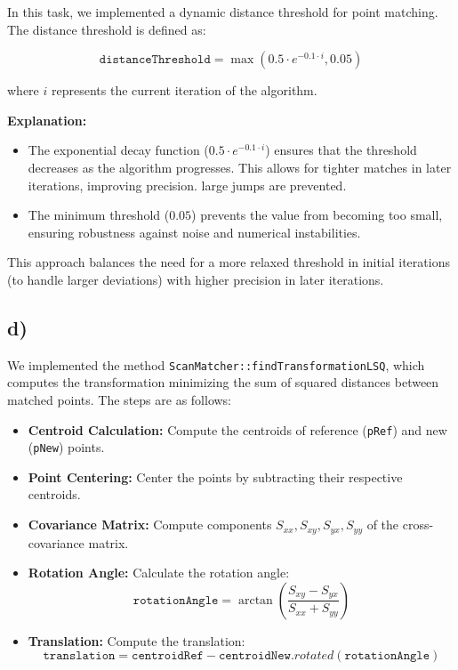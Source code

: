 \documentclass[template,12pt,a4paper,enabledeprecatedfontcommands]{template}
\begin{document}
In this task, we implemented a dynamic distance threshold for point matching. The distance threshold is defined as:

\[
\texttt{distanceThreshold} = \max\left(0.5 \cdot e^{-0.1 \cdot i}, 0.05\right)
\]

where \(i\) represents the current iteration of the algorithm.

\textbf{Explanation:}
\begin{itemize}
    \item The exponential decay function (\(0.5 \cdot e^{-0.1 \cdot i}\)) ensures that the threshold decreases as the algorithm progresses. This allows for tighter matches in later iterations, improving precision. large jumps are prevented.
    \item The minimum threshold (\(0.05\)) prevents the value from becoming too small, ensuring robustness against noise and numerical instabilities.
\end{itemize}

This approach balances the need for a more relaxed threshold in initial iterations (to handle larger deviations) with higher precision in later iterations.



\subsection{d)}

We implemented the method \texttt{ScanMatcher::findTransformationLSQ}, which computes the transformation minimizing the sum of squared distances between matched points. The steps are as follows:

\begin{itemize}
    \item \textbf{Centroid Calculation:} Compute the centroids of reference (\texttt{pRef}) and new (\texttt{pNew}) points.
    \item \textbf{Point Centering:} Center the points by subtracting their respective centroids.
    \item \textbf{Covariance Matrix:} Compute components \(S_{xx}, S_{xy}, S_{yx}, S_{yy}\) of the cross-covariance matrix.
    \item \textbf{Rotation Angle:} Calculate the rotation angle:
    \[
    \texttt{rotationAngle} = \arctan\left(\frac{S_{xy} - S_{yx}}{S_{xx} + S_{yy}}\right)
    \]
    \item \textbf{Translation:} Compute the translation:
    \[
    \texttt{translation} = \texttt{centroidRef} - \texttt{centroidNew}.rotated(\texttt{rotationAngle})
    \]
\end{itemize}
\end{document}
